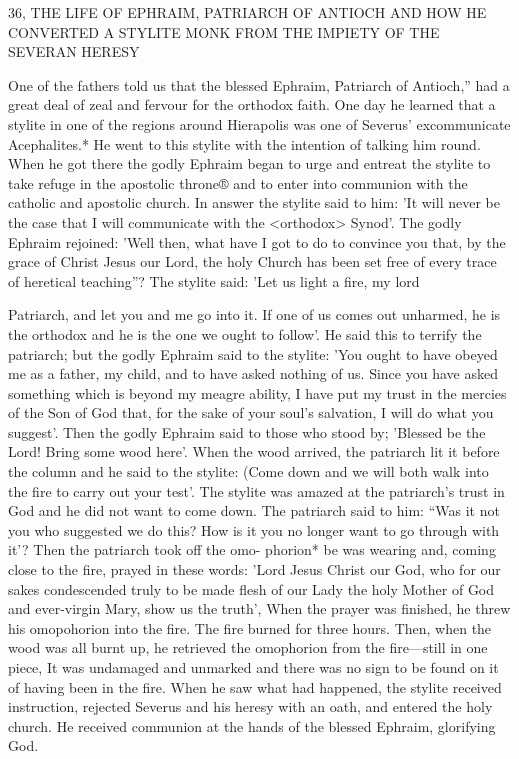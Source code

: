 36, THE LIFE OF EPHRAIM, PATRIARCH OF ANTIOCH
AND HOW HE CONVERTED A STYLITE MONK FROM
THE IMPIETY OF THE SEVERAN HERESY

One of the fathers told us that the blessed Ephraim, Patriarch of
Antioch,” had a great deal of zeal and fervour for the orthodox
faith. One day he learned that a stylite in one of the regions around
Hierapolis was one of Severus' excommunicate Acephalites.* He
went to this stylite with the intention of talking him round. When
he got there the godly Ephraim began to urge and entreat the stylite
to take refuge in the apostolic throne® and to enter into communion
with the catholic and apostolic church. In answer the stylite said to
him: 'It will never be the case that I will communicate with the
<orthodox> Synod'. The godly Ephraim rejoined: 'Well then, what
have I got to do to convince you that, by the grace of Christ Jesus
our Lord, the holy Church has been set free of every trace of
heretical teaching”? The stylite said: 'Let us light a fire, my lord

Patriarch, and let you and me go into it. If one of us comes out
unharmed, he is the orthodox and he is the one we ought to follow'.
He said this to terrify the patriarch; but the godly Ephraim said to
the stylite: 'You ought to have obeyed me as a father, my child, and
to have asked nothing of us. Since you have asked something which
is beyond my meagre ability, I have put my trust in the mercies of
the Son of God that, for the sake of your soul's salvation, I will do
what you suggest'. Then the godly Ephraim said to those who stood
by; 'Blessed be the Lord! Bring some wood here'. When the wood
arrived, the patriarch lit it before the column and he said to the
stylite: (Come down and we will both walk into the fire to carry out
your test'. The stylite was amazed at the patriarch's trust in God
and he did not want to come down. The patriarch said to him: “Was
it not you who suggested we do this? How is it you no longer want
to go through with it'? Then the patriarch took off the omo-
phorion* be was wearing and, coming close to the fire, prayed in
these words: 'Lord Jesus Christ our God, who for our sakes
condescended truly to be made flesh of our Lady the holy Mother
of God and ever-virgin Mary, show us the truth', When the prayer
was finished, he threw his omopohorion into the fire. The fire
burned for three hours. Then, when the wood was all burnt up, he
retrieved the omophorion from the fire—still in one piece, It was
undamaged and unmarked and there was no sign to be found on it
of having been in the fire. When he saw what had happened, the
stylite received instruction, rejected Severus and his heresy with an
oath, and entered the holy church. He received communion at the
hands of the blessed Ephraim, glorifying God.

